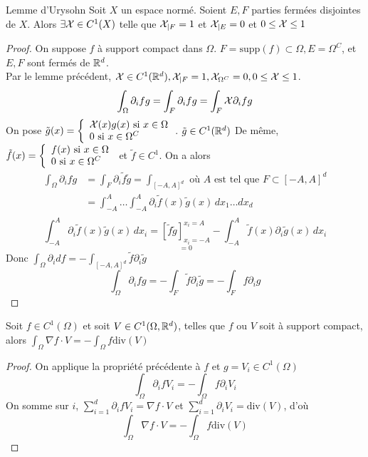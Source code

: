 \documentclass[]{report}
\begin{document}
    \begin{ra}{Lemme d'Urysohn}{}
        Soit $X$ un espace normé. Soient $E,F$ parties fermées disjointes de $X$. Alors $\exists \mathcal{X}\in C^1(X)$ telle que $\mathcal{X}_{|F}=1$ et $\mathcal{X}_{|E}=0$ et $0\le \mathcal{X}\le 1$
    \end{ra}

    \begin{proof}
        On suppose $f$ à support compact dans $\Omega$. $F=\text{supp}(f)\subset \Omega, E=\Omega^C$, et $E,F$ sont fermés de $\mathbb{R}^d$.\\
        Par le lemme précédent, $\mathcal{X}\in C^1(\mathbb{R}^d),\mathcal{X}_{|F}=1,\mathcal{X}_{\Omega^C}=0, 0\le \mathcal{X}\le 1$.
        \[\int_\Omega \partial_i fg=\int_F \partial_i fg=\int_F \mathcal{X} \partial_i f g\]
        On pose $\tilde{g}(x)=\left\{\begin{array}{ll} \mathcal{X}(x)g(x)\text{ si $x\in \Omega$}\\0\text{ si $x\in \Omega^C$} \end{array} \right.$. $\tilde{g}\in C^1(\mathbb{R}^d)$
        De même, $\tilde{f}(x)=\left\{\begin{array}{ll} f(x)\text{ si $x\in \Omega$}\\ 0\text{ si $x\in \Omega^C$} \end{array} \right.$ et $\tilde{f}\in C^1$. On a alors
        \begin{align*}
            \int_\Omega \partial_i fg&=\int_F \partial_i \tilde{f}\tilde{g}=\int_{[-A,A]^d}\text{ où $A$ est tel que $F\subset [-A,A]^d$}\\
            &=\int_{-A}^{A}\ldots\int_{-A}^{A}\partial_i \tilde{f}(x)\tilde{g}(x)\, dx_1\ldots dx_d\\
        \end{align*}
        \[\int_{-A}^{A} \partial_i \tilde{f}(x)\tilde{g}(x)\, dx_i=\underset{=0}{\left[\tilde{f}\tilde{g}\right]_{x_i=-A}^{x_i=A}}-\int_{-A}^{A}\tilde{f}(x)\partial_i \tilde{g}(x)\, dx_i\]
        Donc $\int_\Omega \partial_i df=-\int_{[-A,A]^d}\tilde{f}\partial_i \tilde{g}$
        \[\int_\Omega \partial_i fg=-\int_F \tilde{f}\partial_i \tilde{g}=-\int_F f\partial_i g\]
    \end{proof}

    \begin{cor}{}{}
        Soit $f\in C^1(\Omega)$ et soit $V\in C^1(\Omega,\mathbb{R}^d)$, telles que $f$ ou $V$ soit à support compact, alors $\int_\Omega \nabla f\cdot V=-\int_\Omega f\text{div}(V)$
    \end{cor}

    \begin{proof}
        On applique la propriété précédente à $f$ et $g=V_i\in C^1(\Omega)$
        \[\int_\Omega \partial_i f V_i=-\int_\Omega f\partial_i V_i\]
        On somme sur $i$, $\sum_{i=1}^{d}\partial_i f V_i=\nabla f\cdot V$ et $\sum_{i=1}^{d}\partial_i V_i=\text{div}(V)$, d'où
        \[\int_\Omega \nabla f\cdot V=-\int_\Omega f\text{div}(V)\]
    \end{proof}
\end{document}
